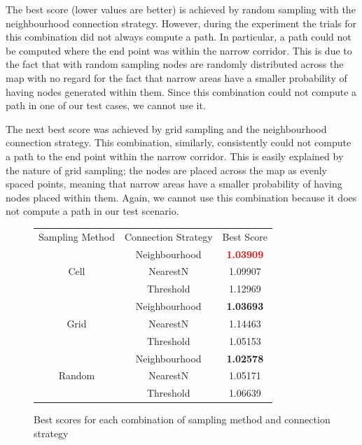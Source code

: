 \documentclass[conference]{IEEEtran}
\begin{document}
The best score (lower values are better) is achieved by random sampling with the neighbourhood connection strategy. However, during the experiment the trials for this combination did not always compute a path. In particular, a path could not be computed where the end point was within the narrow corridor. This is due to the fact that with random sampling nodes are randomly distributed across the map with no regard for the fact that narrow areas have a smaller probability of having nodes generated within them. Since this combination could not compute a path in one of our test cases, we cannot use it.

The next best score was achieved by grid sampling and the neighbourhood connection strategy. This combination, similarly, consistently could not compute a path to the end point within the narrow corridor. This is easily explained by the nature of grid sampling; the nodes are placed across the map as evenly spaced points, meaning that narrow areas have a smaller probability of having nodes placed within them. Again, we cannot use this combination because it does not compute a path in our test scenario.
\begin{figure}[h]
  \centering
  \begin{tabular}{|c|c|c|}
    \cline{1-3}
    Sampling Method & Connection Strategy & Best Score      \\ \cline{1-3}
    \multirow{3}{*}{Cell} & Neighbourhood & \textbf{\textcolor{red}{1.03909}}         \\ \cline{2-3}
    & NearestN  & 1.09907                                     \\ \cline{2-3}
    & Threshold & 1.12969                                       \\ \cline{1-3}
    \multirow{3}{*}{Grid} & Neighbourhood & \textbf{1.03693}                          \\ \cline{2-3}
    & NearestN & 1.14463                                        \\ \cline{2-3}
    & Threshold & 1.05153                                       \\ \cline{1-3}
    \multirow{3}{*}{Random} & Neighbourhood & \textbf{1.02578}                        \\ \cline{2-3}
    & NearestN & 1.05171                                      \\ \cline{2-3}
    & Threshold & 1.06639                                     \\ \cline{1-3}
 \end{tabular}
  \caption{Best scores for each combination of sampling method and connection strategy}
  \label{fig:sampleconntable}
\end{figure}
\end{document}
